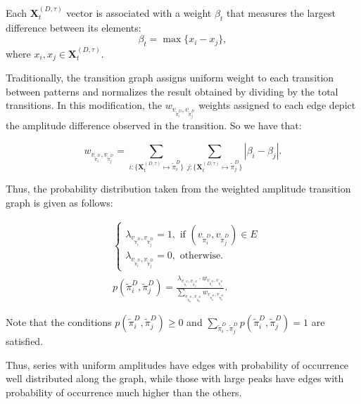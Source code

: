 \documentclass{isprs}
\begin{document}
Each $\mathbf{X}^{(D, \tau)}_t$ vector is associated with a weight $\beta_t$ that measures the largest difference between its elements:
\begin{equation}
\beta_t = \max\{x_i - x_j\},
\end{equation}
where $x_i, x_j \in \mathbf{X}^{(D, \tau)}_t$.

Traditionally, the transition graph assigns uniform weight to each transition between patterns and normalizes the result obtained by dividing by the total transitions.
In this modification, the $w_{v_{\widetilde\pi^D_i}, v_{\widetilde\pi^D_j}}$ weights assigned to each edge depict the amplitude difference observed in the transition.
So we have that:	

\begin{equation}
w_{v_{\widetilde \pi^D_i}, v_{\widetilde \pi^D_j}} =  \sum_{i : \{\mathbf{X}^{(D,\tau)}_t \mapsto \widetilde\pi^D_i\}} \sum_{j : \{\mathbf{X}^{(D,\tau)}_t \mapsto \widetilde\pi^D_j\}} |\beta_i - \beta_j| .
\end{equation}

Thus, the probability distribution taken from the weighted amplitude transition graph is given as follows:	

\begin{align}
&\left\{\begin{array}{l}
\lambda_{v_{\widetilde\pi^D_i}, v_{\widetilde\pi^D_j}} = 1, \text{ if } (v_{\widetilde\pi^D_i}, v_{\widetilde\pi^D_j}) \in {E} \\
\lambda_{v_{\widetilde\pi^D_i}, v_{\widetilde\pi^D_j}} = 0, \text{ otherwise}.
\end{array}\right. \\
%
&p(\widetilde\pi^D_i, \widetilde\pi^D_j) = \frac{\lambda_{v_{\widetilde\pi^D_i}, v_{\widetilde\pi^D_j}} \cdot w_{v_{\widetilde\pi^D_i}, v_{\widetilde\pi^D_j}}}{\sum_{v_{\widetilde\pi^D_a}, v_{\widetilde\pi^D_b}} w_{v_{\widetilde\pi^D_a}, v_{\widetilde\pi^D_b}}}.
\end{align}

Note that the conditions $p(\widetilde\pi^D_i, \widetilde\pi^D_j) \ge 0$ and $\sum_{\widetilde\pi^D_i, \widetilde\pi^D_j} p(\widetilde\pi^D_i, \widetilde\pi^D_j) = 1$ are satisfied.

Thus, series with uniform amplitudes have edges with probability of occurrence well distributed along the graph, while those with large peaks have edges with probability of occurrence much higher than the others.
\end{document}
